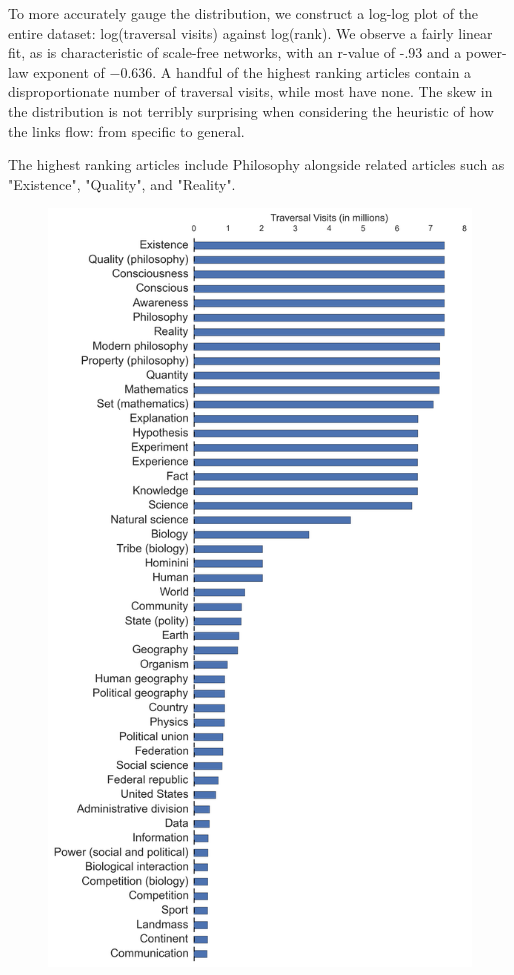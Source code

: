 \documentclass[pre,twocolumn,twoside,superscriptaddress,floatfix, aps, 10pt]{revtex4-1}
\begin{document}
To more accurately gauge the distribution, we construct a log-log plot of the entire dataset: log(traversal visits) against log(rank). We observe a fairly linear fit, as is characteristic of scale-free networks, with an r-value of -.93 and 
a power-law exponent of $-0.636$. A handful of the highest ranking articles contain a disproportionate number of traversal visits, while most have none. The skew in the distribution is not terribly surprising when considering the heuristic of how the links flow: from specific to general. 

The highest ranking articles include Philosophy alongside related articles such as "Existence", "Quality", and "Reality".

\begin{figure}[tp!]
  \centering	
  \includegraphics[width=\columnwidth]{graphics/articles_ranked.png}

\end{figure}
\end{document}
